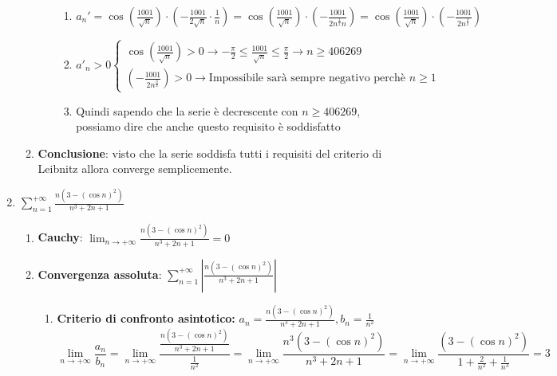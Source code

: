\documentclass[10pt, a4paper]{article}
\begin{document}
\begin{enumerate}
\begin{enumerate}
\begin{enumerate}
\begin{enumerate}
                        \item $a_n'=\cos\left(\frac{1001}{\sqrt{n}}\right)\cdot\left(-\frac{1001}{2\sqrt{n}}\cdot\frac{1}{n}\right)=\cos\left(\frac{1001}{\sqrt{n}}\right)\cdot\left(-\frac{1001}{2n^{\frac{1}{2}}n}\right)=\cos\left(\frac{1001}{\sqrt{n}}\right)\cdot\left(-\frac{1001}{2n^{\frac{3}{2}}}\right)$
                        \item $a'_n>0\begin{cases}
                            \cos\left(\frac{1001}{\sqrt{n}}\right)>0\rightarrow -\frac{\pi}{2}\leq\frac{1001}{\sqrt{n}}\leq\frac{\pi}{2}\rightarrow n \geq 406269\\
                            \left(-\frac{1001}{2n^{\frac{3}{2}}}\right)>0\rightarrow \text{Impossibile sarà sempre negativo perchè } n\geq 1
                        \end{cases}$
                        \item Quindi sapendo che la serie è decrescente con $n\geq 406269$, possiamo dire che anche questo requisito è soddisfatto
                    \end{enumerate}
                \end{enumerate}
                \item \textbf{Conclusione}: visto che la serie soddisfa tutti i requisiti del criterio di Leibnitz allora converge semplicemente.
            \end{enumerate}
            \item $\sum_{n=1}^{+\infty}\frac{n(3-(\cos n)^2)}{n^3+2n+1}$ \begin{enumerate}
                \item \textbf{Cauchy}: $\lim_{n\rightarrow+\infty}\frac{n(3-(\cos n)^2)}{n^3+2n+1}=0$
                \item \textbf{Convergenza assoluta}: $\sum_{n=1}^{+\infty}\left|\frac{n(3-(\cos n)^2)}{n^3+2n+1}\right|$ \begin{enumerate}
                    \item \textbf{Criterio di confronto asintotico:} $a_n=\frac{n(3-(\cos n)^2)}{n^3+2n+1}, b_n=\frac{1}{n^2}$ \begin{equation*}
                            \lim_{n\rightarrow+\infty}\frac{a_n}{b_n}=\lim_{n\rightarrow+\infty}\frac{\frac{n(3-(\cos n)^2)}{n^3+2n+1}}{\frac{1}{n^2}}=\lim_{n\rightarrow+\infty}\frac{n^3\left(3-(\cos n)^2\right)}{n^3+2n+1} = \lim_{n\rightarrow+\infty}\frac{\left(3-(\cos n)^2\right)}{1+\frac{2}{n^2}+\frac{1}{n^3}}=3
                    \end{equation*}

\end{enumerate}
\end{enumerate}
\end{enumerate}
\end{document}
